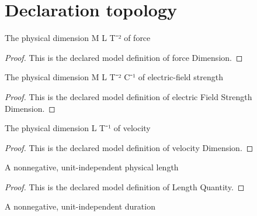 \section{Declaration topology}
\begin{definition}
  \label{def:physics:phyx-mini-0912:phyxminiproblems-problemphyxmini0912-forcedimension}
  The physical dimension M L T⁻² of force
\end{definition}
\begin{proof}
  This is the declared model definition of force Dimension.
\end{proof}
\begin{definition}
  \label{def:physics:phyx-mini-0912:phyxminiproblems-problemphyxmini0912-electricfieldstrengthdimension}
  The physical dimension M L T⁻² C⁻¹ of electric-field strength
\end{definition}
\begin{proof}
  This is the declared model definition of electric Field Strength Dimension.
\end{proof}
\begin{definition}
  \label{def:physics:phyx-mini-0912:phyxminiproblems-problemphyxmini0912-velocitydimension}
  The physical dimension L T⁻¹ of velocity
\end{definition}
\begin{proof}
  This is the declared model definition of velocity Dimension.
\end{proof}
\begin{definition}
  \label{def:physics:phyx-mini-0912:phyxminiproblems-problemphyxmini0912-lengthquantity}
  A nonnegative, unit-independent physical length
\end{definition}
\begin{proof}
  This is the declared model definition of Length Quantity.
\end{proof}
\begin{definition}
  \label{def:physics:phyx-mini-0912:phyxminiproblems-problemphyxmini0912-durationquantity}
  A nonnegative, unit-independent duration
\end{definition}
